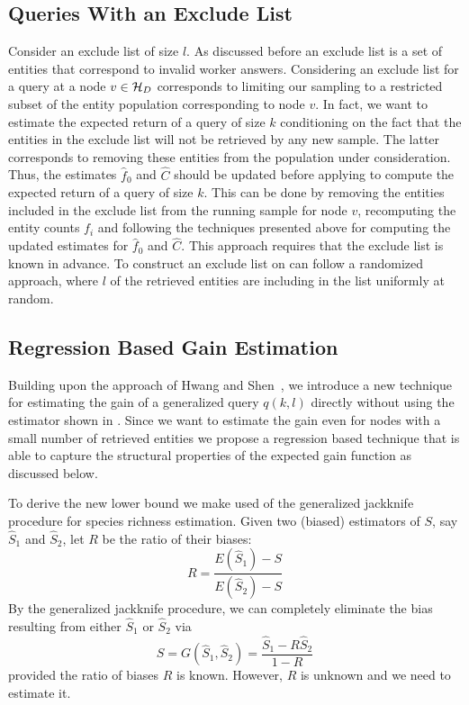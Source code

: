 \subsection{Queries With an Exclude List}
\label{sec:excludelist}
Consider an exclude list of size $l$. As discussed before an exclude list is a set of entities that correspond to invalid worker answers. Considering an exclude list for a query at a node $v \in \mathcal{H}_D$ corresponds to limiting our sampling to a restricted subset of the entity population corresponding to node $v$. In fact, we want to estimate the expected return of a query of size $k$ conditioning on the fact that the entities in the exclude list will not be retrieved by any new sample. The latter corresponds to removing these entities from the population under consideration. Thus, the estimates $\hat{f}_0$ and $\hat{C}$ should be updated before applying  to compute the expected return of a query of size $k$. This can be done by removing the entities included in the exclude list from the running sample for node $v$, recomputing the entity counts $f_i$ and following the techniques presented above for computing the updated estimates for $\hat{f}_0$ and $\hat{C}$. This approach requires that the exclude list is known in advance. To construct an exclude list on can follow a randomized approach, where $l$ of the retrieved entities are including in the list uniformly at random. 

\subsection{Regression Based Gain Estimation}
\label{sec:newestim}
Building upon the approach of Hwang and Shen~\cite{hwang:2010}, we introduce a new technique for estimating the gain of a generalized query $q(k,l)$ directly without using the estimator shown in . Since we want to estimate the gain even for nodes with a small number of retrieved entities we propose a regression based technique that is able to capture the structural properties of the expected gain function as discussed below. 

To derive the new lower bound we make used of the generalized jackknife procedure for species richness estimation. Given two (biased) estimators of $S$, say $\hat{S}_1$ and $\hat{S}_2$, let $R$ be the ratio of their biases:
\begin{equation}
R = \frac{E(\hat{S}_1) - S}{E(\hat{S}_2) - S}
\end{equation}
By the generalized jackknife procedure, we can completely eliminate the bias resulting from either $\hat{S}_1$ or $\hat{S}_2$ via
\begin{equation}
S = G(\hat{S}_1, \hat{S}_2) = \frac{\hat{S}_1 - R\hat{S}_2}{1 - R}
\label{eq:jknife}
\end{equation}
provided the ratio of biases $R$ is known. However, $R$ is unknown and we need to estimate it. 


